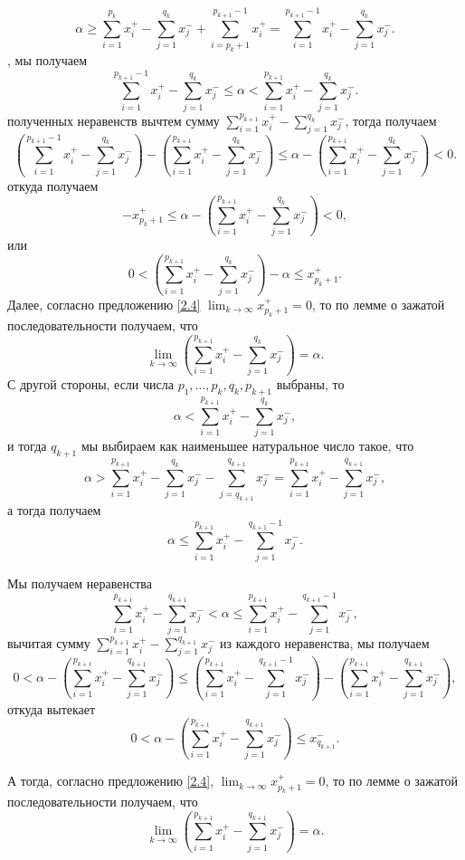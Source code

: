 \documentclass[a4paper]{article}
\begin{document}
$$
\alpha \ge \sum_{i=1}^{p_k}x_i^+ - \sum_{j=1}^{q_k} x_j^- + \sum_{i=p_k+1}^{p_{k+1}-1} x_i^+ = \sum_{i=1}^{p_{k+1}-1}x_i^+ - \sum_{j=1}^{q_k}x_j^-.
$$
, мы получаем
$$
\sum_{i=1}^{p_{k+1}-1}x_i^+ - \sum_{j=1}^{q_k}x_j^- \le \alpha < \sum_{i=1}^{p_{k+1}}x_i^+ - \sum_{j=1}^{q_k}x_j^-.
$$
 полученных неравенств вычтем сумму $\sum_{i=1}^{p_{k+1}}x_i^+ - \sum_{j=1}^{q_k}x_j^-$, тогда получаем
$$
\left(\sum_{i=1}^{p_{k+1}-1}x_i^+ - \sum_{j=1}^{q_k}x_j^-\right) - \left( \sum_{i=1}^{p_{k+1}}x_i^+ - \sum_{j=1}^{q_k}x_j^- \right) \le \alpha - \left( \sum_{i=1}^{p_{k+1}}x_i^+ - \sum_{j=1}^{q_k}x_j^- \right) < 0.
$$
откуда получаем
$$
- x_{p_k+1}^+ \le \alpha - \left( \sum_{i=1}^{p_{k+1}}x_i^+ - \sum_{j=1}^{q_k}x_j^- \right) < 0,
$$
или
$$
0 < \left( \sum_{i=1}^{p_{k+1}}x_i^+ - \sum_{j=1}^{q_k}x_j^- \right) - \alpha \le x_{p_k+1}^+.
$$
Далее, согласно предложению \ref{2.4} $\lim_{k \to \infty}x_{p_k+1}^+ = 0$, то по лемме о зажатой последовательности получаем, что
\begin{equation}\label{2.5.1}
\boxed{
\lim_{k\to \infty} \left( \sum_{i=1}^{p_{k+1}}x_i^+ - \sum_{j=1}^{q_k}x_j^- \right) = \alpha.    
}
\end{equation}
С другой стороны, если числа $p_1,\ldots, p_k,q_k,p_{k+1}$ выбраны, то
$$
\alpha < \sum_{i=1}^{p_{k+1}} x_i^+-  \sum_{j=1}^{q_k}x_j^-,
$$
и тогда $q_{k+1}$ мы выбираем как наименьшее натуральное число такое, что
$$
\alpha > \sum_{i=1}^{p_{k+1}} x_i^+-  \sum_{j=1}^{q_k}x_j^- - \sum_{j=q_{k+1}}^{q_{k+1}} x_j^- = \sum_{i=1}^{p_{k+1}} x_i^+-  \sum_{j=1}^{q_{k+1}}x_j^-,
$$
а тогда получаем
$$
\alpha \le \sum_{i=1}^{p_{k+1}} x_i^+-  \sum_{j=1}^{q_{k+1}-1}x_j^-.
$$

Мы получаем неравенства
$$
\sum_{i=1}^{p_{k+1}} x_i^+-  \sum_{j=1}^{q_{k+1}}x_j^- < \alpha \le \sum_{i=1}^{p_{k+1}} x_i^+-  \sum_{j=1}^{q_{k+1}-1}x_j^-, 
$$
вычитая сумму $\sum_{i=1}^{p_{k+1}} x_i^+-  \sum_{j=1}^{q_{k+1}}x_j^-$ из каждого неравенства, мы получаем
$$
0 < \alpha - \left( \sum_{i=1}^{p_{k+1}} x_i^+-  \sum_{j=1}^{q_{k+1}}x_j^- \right) \le \left( \sum_{i=1}^{p_{k+1}} x_i^+-  \sum_{j=1}^{q_{k+1}-1}x_j^-\right) - \left( \sum_{i=1}^{p_{k+1}} x_i^+-  \sum_{j=1}^{q_{k+1}}x_j^-\right),
$$
откуда вытекает
$$
0 < \alpha - \left( \sum_{i=1}^{p_{k+1}} x_i^+-  \sum_{j=1}^{q_{k+1}}x_j^- \right) \le x_{q_{k+1}}^-.
$$

А тогда, согласно предложению \ref{2.4}, $\lim_{k \to \infty}x_{p_k+1}^+ = 0$, то по лемме о зажатой последовательности получаем, что
\begin{equation}\label{2.5.2}
\boxed{
\lim_{k\to \infty} \left( \sum_{i=1}^{p_{k+1}}x_i^+ - \sum_{j=1}^{q_{k+1}}x_j^- \right) = \alpha.    
}
\end{equation}
\end{document}
